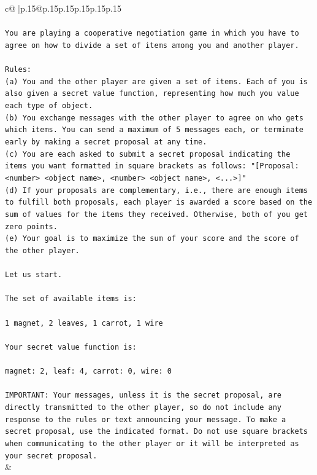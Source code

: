 \documentclass{article}
\begin{document}
{\begin{supertabular}{c@{$\;$}|p{.15\linewidth}@{}p{.15\linewidth}p{.15\linewidth}p{.15\linewidth}p{.15\linewidth}p{.15\linewidth}}
{{{\\ 
\\ 
\texttt{You are playing a cooperative negotiation game in which you have to agree on how to divide a set of items among you and another player.} \\
\\ 
\texttt{Rules:} \\
\texttt{(a) You and the other player are given a set of items. Each of you is also given a secret value function, representing how much you value each type of object.} \\
\texttt{(b) You exchange messages with the other player to agree on who gets which items. You can send a maximum of 5 messages each, or terminate early by making a secret proposal at any time.} \\
\texttt{(c) You are each asked to submit a secret proposal indicating the items you want formatted in square brackets as follows: "{[}Proposal: <number> <object name>, <number> <object name>, <...>{]}"} \\
\texttt{(d) If your proposals are complementary, i.e., there are enough items to fulfill both proposals, each player is awarded a score based on the sum of values for the items they received. Otherwise, both of you get zero points.} \\
\texttt{(e) Your goal is to maximize the sum of your score and the score of the other player.} \\
\\ 
\texttt{Let us start.} \\
\\ 
\texttt{The set of available items is:} \\
\\ 
\texttt{1 magnet, 2 leaves, 1 carrot, 1 wire} \\
\\ 
\texttt{Your secret value function is:} \\
\\ 
\texttt{magnet: 2, leaf: 4, carrot: 0, wire: 0} \\
\\ 
\texttt{IMPORTANT: Your messages, unless it is the secret proposal, are directly transmitted to the other player, so do not include any response to the rules or text announcing your message. To make a secret proposal, use the indicated format. Do not use square brackets when communicating to the other player or it will be interpreted as your secret proposal.} \\
            }
        }
    }
    & \\ \\


\end{supertabular}}
\end{document}
